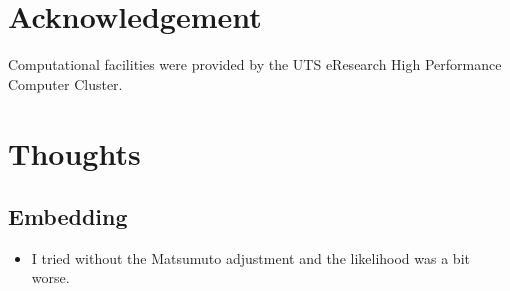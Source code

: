 \documentclass[11pt, twocolumn]{article}
\begin{document}
%
%

\section{Acknowledgement}
Computational facilities were provided by the UTS eResearch High Performance Computer Cluster.

\nocite{*}



\clearpage
\section{Thoughts}
\subsection{Embedding}
\begin{itemize}
\item I tried without the Matsumuto adjustment and the likelihood was a bit worse.
\end{itemize}
\end{document}
